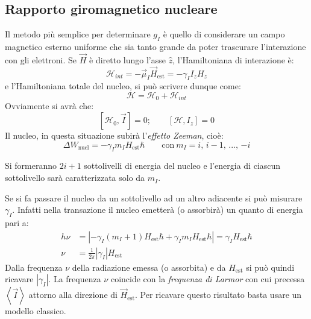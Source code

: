 \subsection{Rapporto giromagnetico nucleare}
Il metodo più semplice per determinare $g_I$ è quello di considerare un campo magnetico esterno uniforme che sia tanto grande da poter trascurare l'interazione con gli elettroni.
Se $\vec{H}$ è diretto lungo l'asse $\hat{z}$, l'Hamiltoniana di interazione è:
\begin{equation}
\mathcal{H}_{int} = - \vec{\mu}_I \vec{H}_\text{est} = - \gamma_I I_z H_z
\end{equation}
e l'Hamiltoniana totale del nucleo, si può scrivere dunque come:
\begin{equation}
\mathcal{H} = \mathcal{H}_0 + \mathcal{H}_{int}
\end{equation}
Ovviamente si avrà che:
\begin{equation}
\left [ \mathcal{H}_0, \vec{I} \right ] = 0; \qquad \left [ \mathcal{H}, I_z \right ] = 0
\end{equation}
Il nucleo, in questa situazione subirà l'\textit{effetto Zeeman}, cioè:
\begin{equation}
\Delta W_\text{nucl} = - \gamma_I m_I H_\text{est} \hbar \qquad \text{con}\ m_I = \text{$i$, $i-1$, ..., $-i$}
\end{equation}

Si formeranno $2i+1$ sottolivelli di energia del nucleo e l'energia di ciascun
sottolivello sarà caratterizzata solo da $m_I$.

Se si fa passare il nucleo da un sottolivello ad un altro adiacente si può
misurare $\gamma_I$. Infatti nella transazione il nucleo emetterà (o assorbirà)
un quanto di energia pari a:
\begin{equation}\begin{split}
h \nu &= \left| - \gamma_I(m_I + 1) H_\text{est} \hbar + \gamma_I m_I H_\text{est} \hbar \right| = \gamma_I H_\text{est} \hbar \\
\nu &= \frac{1}{2\pi} \left| \gamma_I \right| H_\text{est}
\end{split}\end{equation}
Dalla frequenza $\nu$ della radiazione emessa (o assorbita) e da $H_\text{est}$ si può quindi ricavare $\left| \gamma_I \right|$. La frequenza $\nu$ coincide con la \textit{frequenza di Larmor} con cui precessa $\left\langle \vec{I} \right\rangle$ attorno alla direzione di $\vec{H}_\text{est}$. Per ricavare questo risultato basta usare un modello classico.

